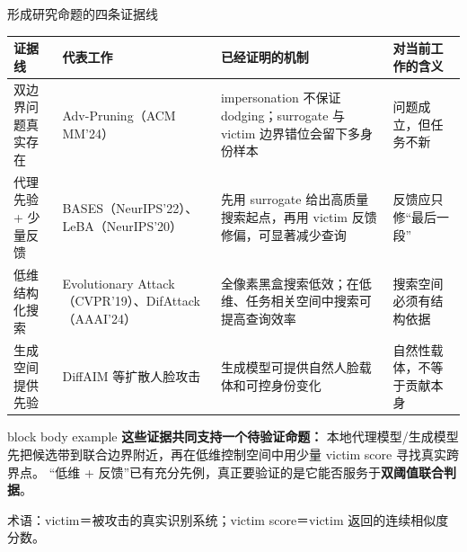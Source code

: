 \begin{frame}{形成研究命题的四条证据线}
  \scriptsize
  \renewcommand{\arraystretch}{1.25}
  \setlength{\tabcolsep}{4pt}
  \begin{tabular}{p{2.35cm}p{3.15cm}p{5.1cm}p{2.4cm}}
    \toprule
    证据线 & 代表工作 & 已经证明的机制 & 对当前工作的含义 \\
    \midrule
    双边界问题真实存在 & Adv-Pruning（ACM MM'24） &
      impersonation 不保证 dodging；surrogate 与 victim 边界错位会留下多身份样本 &
      问题成立，但任务不新 \\[2pt]
    代理先验 + 少量反馈 & BASES（NeurIPS'22）、LeBA（NeurIPS'20） &
      先用 surrogate 给出高质量搜索起点，再用 victim 反馈修偏，可显著减少查询 &
      反馈应只修“最后一段” \\[2pt]
    低维结构化搜索 & Evolutionary Attack（CVPR'19）、DifAttack（AAAI'24） &
      全像素黑盒搜索低效；在低维、任务相关空间中搜索可提高查询效率 &
      搜索空间必须有结构依据 \\[2pt]
    生成空间提供先验 & DiffAIM 等扩散人脸攻击 &
      生成模型可提供自然人脸载体和可控身份变化 &
      自然性载体，不等于贡献本身 \\
    \bottomrule
  \end{tabular}

  \vspace{0.35em}
  \begin{beamercolorbox}[wd=\textwidth,sep=3pt]{block body example}
    \footnotesize
    \textbf{这些证据共同支持一个待验证命题：}
    本地代理模型/生成模型先把候选带到联合边界附近，再在低维控制空间中用少量 victim score 寻找真实跨界点。
    “低维 + 反馈”已有充分先例，真正要验证的是它能否服务于\textbf{双阈值联合判据}。
  \end{beamercolorbox}
  {\tiny 术语：victim＝被攻击的真实识别系统；victim score＝victim 返回的连续相似度分数。}
\end{frame}

